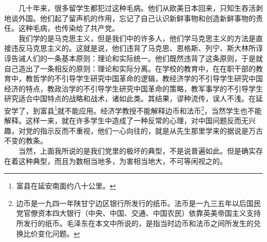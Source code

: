 \documentclass[cn,11pt,chinese]{elegantbook}
\begin{document}
　　几十年来，很多留学生都犯过这种毛病。他们从欧美日本回来，只知生吞活剥地谈外国。他们起了留声机的作用，忘记了自己认识新鲜事物和创造新鲜事物的责任。这种毛病，也传染给了共产党。\\
　　我们学的是马克思主义，但是我们中的许多人，他们学马克思主义的方法是直接违反马克思主义的。这就是说，他们违背了马克思、恩格斯、列宁、斯大林所谆谆告诫人们的一条基本原则：理论和实际统一。他们既然违背了这条原则，于是就自己造出了一条相反的原则：理论和实际分离。在学校的教育中，在在职干部的教育中，教哲学的不引导学生研究中国革命的逻辑，教经济学的不引导学生研究中国经济的特点，教政治学的不引导学生研究中国革命的策略，教军事学的不引导学生研究适合中国特点的战略和战术，诸如此类。其结果，谬种流传，误人不浅。在延安学了，到富县\footnote[1]{ 富县在延安南面约八十公里。}就不能应用。经济学教授不能解释边币和法币\footnote[2]{ 边币是一九四一年陕甘宁边区银行所发行的纸币。法币是一九三五年以后国民党官僚资本四大银行（中央、中国、交通、中国农民）依靠英美帝国主义支持所发行的纸币。毛泽东在本文中所说的，是指当时边币和法币之间所发生的兑换比价变化问题。}，当然学生也不能解释。这样一来，就在许多学生中造成了一种反常的心理，对中国问题反而无兴趣，对党的指示反而不重视，他们一心向往的，就是从先生那里学来的据说是万古不变的教条。\\
　　当然，上面我所说的是我们党里的极坏的典型，不是说普遍如此。但是确实存在着这种典型，而且为数相当地多，为害相当地大，不可等闲视之的。\\
\end{document}
